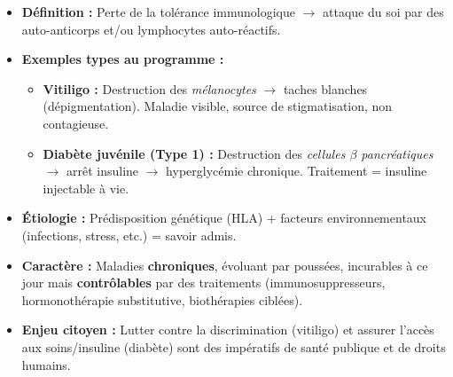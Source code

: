 \documentclass[11pt]{article}
\newcommand{\cle}[1]{{\popxbold\color{popdark}#1}}
\begin{document}
\begin{aretenir}
\begin{itemize}
    \item \textbf{Définition :} Perte de la tolérance immunologique $\rightarrow$ attaque du \cle{soi} par des \cle{auto-anticorps} et/ou \cle{lymphocytes auto-réactifs}.
    \item \textbf{Exemples types au programme :}
    \begin{itemize}
        \item \textbf{Vitiligo :} Destruction des \emph{mélanocytes} $\rightarrow$ taches blanches (dépigmentation). Maladie visible, source de stigmatisation, non contagieuse.
        \item \textbf{Diabète juvénile (Type 1) :} Destruction des \emph{cellules $\beta$ pancréatiques} $\rightarrow$ arrêt insuline $\rightarrow$ hyperglycémie chronique. Traitement = insuline injectable à vie.
    \end{itemize}
    \item \textbf{Étiologie :} Prédisposition génétique (HLA) + facteurs environnementaux (infections, stress, etc.) = savoir admis.
    \item \textbf{Caractère :} Maladies \textbf{chroniques}, évoluant par poussées, incurables à ce jour mais \textbf{contrôlables} par des traitements (immunosuppresseurs, hormonothérapie substitutive, biothérapies ciblées).
    \item \textbf{Enjeu citoyen :} Lutter contre la discrimination (vitiligo) et assurer l'accès aux soins/insuline (diabète) sont des impératifs de santé publique et de droits humains.
\end{itemize}
\end{aretenir}
\end{document}
